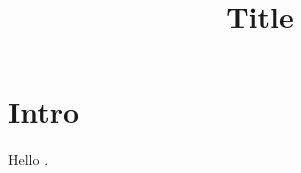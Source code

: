 \documentclass{IEEEtran}
\title{Title}
\begin{document}
\maketitle

\section{Intro}

Hello \cite{cityhash}. 

 
 
\end{document}
